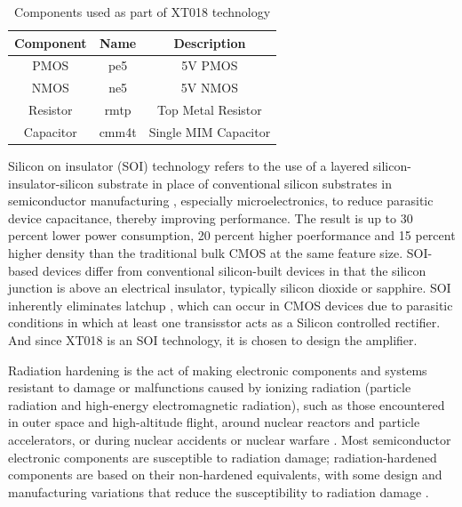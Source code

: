 \begin{table} [H]
\centering
\begin{tabular}{@{}ccc@{}}
\toprule
Component	& Name		& Description			\\ \midrule
PMOS		& pe5		& 5V PMOS				\\
NMOS		& ne5		& 5V NMOS				\\
Resistor	& rmtp		& Top Metal Resistor	\\
Capacitor	& cmm4t		& Single MIM Capacitor	\\
\bottomrule
\end{tabular}
\caption{Components used as part of XT018 technology}
\label{tab:Components}
\end{table}

Silicon on insulator (SOI) technology refers to the use of a layered silicon-insulator-silicon substrate in place of conventional silicon substrates in semiconductor manufacturing \cite{soi_tech}, especially microelectronics, to reduce parasitic device capacitance, thereby improving performance. The result is up to 30 percent lower power consumption, 20 percent higher poerformance and 15 percent higher density than the traditional bulk CMOS at the same feature size. SOI-based devices differ from conventional silicon-built devices in that the silicon junction is above an electrical insulator, typically silicon dioxide or sapphire. SOI inherently eliminates latchup \cite{soi_ease}, which can occur in CMOS devices due to parasitic conditions in which at least one transisstor acts as a Silicon controlled rectifier. And since XT018 is an SOI technology, it is chosen to design the amplifier.

Radiation hardening is the act of making electronic components and systems resistant to damage or malfunctions caused by ionizing radiation (particle radiation and high-energy electromagnetic radiation), such as those encountered in outer space and high-altitude flight, around nuclear reactors and particle accelerators, or during nuclear accidents or nuclear warfare \cite{radhard}. Most semiconductor electronic components are susceptible to radiation damage; radiation-hardened components are based on their non-hardened equivalents, with some design and manufacturing variations that reduce the susceptibility to radiation damage \cite{radhard_effects}. 